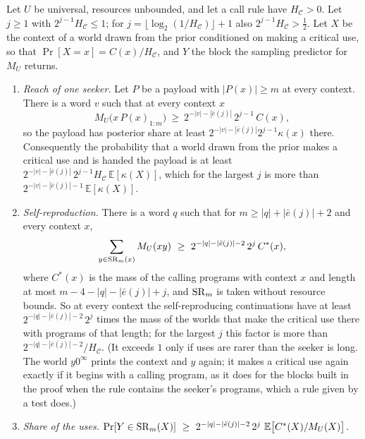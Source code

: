 \begin{theorem}\label{thm:critical}
Let $U$ be universal, resources unbounded, and let a call rule have $H_{\mathcal C}>0$. Let $j\ge1$ with
$2^{j-1}H_{\mathcal C}\le1$; for $j=\lfloor\log_2(1/H_{\mathcal C})\rfloor+1$ also $2^{j-1}H_{\mathcal C}>\frac12$.
Let $X$ be the context of a world drawn from the prior conditioned on making a critical use, so that
$\Pr[X=x]=C(x)/H_{\mathcal C}$, and $Y$ the block the sampling predictor for $M_U$ returns.
\begin{enumerate}[label=(\alph*),leftmargin=2em,itemsep=2pt,topsep=2pt]
\item \emph{Reach of one seeker.} Let $P$ be a payload with $|P(x)|\ge m$ at every context. There is a word
$v$ such that at every context $x$
\[
M_U\bigl(x\,P(x)_{1:m}\bigr)\ \ge\ 2^{-|v|-|\bar e(j)|}\,2^{j-1}\,C(x),
\]
so the payload has posterior share at least $2^{-|v|-|\bar e(j)|}2^{j-1}\kappa(x)$ there. Consequently the
probability that a world drawn from the prior makes a critical use and is handed the payload is at least
$2^{-|v|-|\bar e(j)|}\,2^{j-1}H_{\mathcal C}\,\mathbb E[\kappa(X)]$, which for the largest $j$ is more than
$2^{-|v|-|\bar e(j)|-1}\,\mathbb E[\kappa(X)]$.
\item \emph{Self-reproduction.} There is a word $q$ such that for $m\ge|q|+|\bar e(j)|+2$ and every context
$x$,
\[
\sum_{y\in\SR_m(x)}M_U(xy)\ \ge\ 2^{-|q|-|\bar e(j)|-2}\,2^{j}\,C^*(x),
\]
where $C^*(x)$ is the mass of the calling programs with context $x$ and length at most
$m-4-|q|-|\bar e(j)|+j$, and $\mathrm{SR}_m$ is taken without resource bounds. So at every context the self-reproducing
continuations have at least $2^{-|q|-|\bar e(j)|-2}\,2^{j}$ times the mass of the worlds that make the critical
use there with programs of that length; for the largest $j$ this factor is more than
$2^{-|q|-|\bar e(j)|-2}/H_{\mathcal C}$. (It exceeds $1$ only if uses are rarer than the seeker is long. The
world $y0^\infty$ prints the context and $y$ again; it makes a critical use again exactly if it begins with a
calling program, as it does for the blocks built in the proof when the rule contains the seeker's programs,
which a rule given by a test does.)
\item \emph{Share of the uses.}
$\Pr[Y\in\mathrm{SR}_m(X)]\ \ge\ 2^{-|q|-|\bar e(j)|-2}\,2^{j}\ \mathbb E\bigl[C^*(X)/M_U(X)\bigr]$.
\end{enumerate}
\end{theorem}
